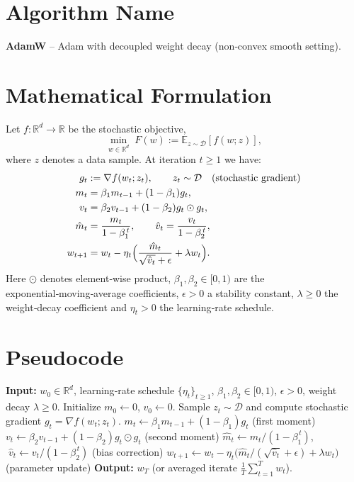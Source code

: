 \documentclass{article}
\newcommand{\E}{\mathbb{E}}
\newcommand{\R}{\mathbb{R}}
\begin{document}
\section*{Algorithm Name}
\textbf{AdamW} – Adam with decoupled weight decay (non‑convex smooth setting).

\section*{Mathematical Formulation}
Let $f:\R^d\rightarrow\R$ be the stochastic objective,
\[
\min_{w\in\R^d}\;F(w):=\E_{z\sim\mathcal{D}}[f(w;z)],
\]
where $z$ denotes a data sample.  
At iteration $t\ge 1$ we have:
\begin{align}
g_t &:= \nabla f(w_t;z_t), \qquad z_t\sim\mathcal{D}\quad\text{(stochastic gradient)} \\
m_t &= \beta_1 m_{t-1} + (1-\beta_1)g_t, \label{eq:m}\\
v_t &= \beta_2 v_{t-1} + (1-\beta_2)g_t\odot g_t, \label{eq:v}\\
\hat m_t &= \frac{m_t}{1-\beta_1^{\,t}}, \qquad 
\hat v_t = \frac{v_t}{1-\beta_2^{\,t}}, \label{eq:bias}\\
w_{t+1} &= w_t - \eta_t\Bigl(\frac{\hat m_t}{\sqrt{\hat v_t}+\epsilon}+ \lambda w_t\Bigr). \label{eq:update}
\end{align}
Here $\odot$ denotes element‑wise product, $\beta_1,\beta_2\in[0,1)$ are the exponential‑moving‑average coefficients,
$\epsilon>0$ a stability constant, $\lambda\ge0$ the weight‑decay coefficient and $\eta_t>0$ the learning‑rate schedule.

\section*{Pseudocode}
\begin{algorithm}[H]
\caption{AdamW}
\begin{algorithmic}[1]
\STATE \textbf{Input:} $w_0\in\R^d$, learning‑rate schedule $\{\eta_t\}_{t\ge1}$,
$\beta_1,\beta_2\in[0,1)$, $\epsilon>0$, weight decay $\lambda\ge0$.
\STATE Initialize $m_0\gets 0$, $v_0\gets 0$.
    \STATE Sample $z_t\sim\mathcal{D}$ and compute stochastic gradient $g_t=\nabla f(w_t;z_t)$.
    \STATE $m_t \gets \beta_1 m_{t-1} + (1-\beta_1) g_t$ \hfill (first moment) \label{alg:m}
    \STATE $v_t \gets \beta_2 v_{t-1} + (1-\beta_2) g_t\odot g_t$ \hfill (second moment) \label{alg:v}
    \STATE $\hat m_t \gets m_t/(1-\beta_1^{\,t})$, $\;\hat v_t \gets v_t/(1-\beta_2^{\,t})$ \hfill (bias correction) \label{alg:bias}
    \STATE $w_{t+1} \gets w_t - \eta_t\bigl(\hat m_t/(\sqrt{\hat v_t}+\epsilon) + \lambda w_t\bigr)$ \hfill (parameter update) \label{alg:update}
\ENDFOR
\STATE \textbf{Output:} $w_T$ (or averaged iterate $\frac1T\sum_{t=1}^T w_t$).
\end{algorithmic}
\end{algorithm}
\end{document}
